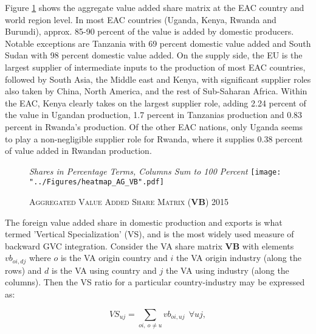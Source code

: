 \documentclass[a4paper]{article}
\begin{document}
Figure \ref{fig:wldVB} shows the aggregate value added share matrix at the EAC country and world region level. In most EAC countries (Uganda, Kenya, Rwanda and Burundi), approx. 85-90 percent of the value is added by domestic producers. Notable exceptions are Tanzania with 69 percent domestic value added and South Sudan with 98 percent domestic value added. On the supply side, the EU is the largest supplier of intermediate inputs to the production of most EAC countries, followed by South Asia, the Middle east and Kenya, with significant supplier roles also taken by China, North America, and the rest of Sub-Saharan Africa. Within the EAC, Kenya clearly takes on the largest supplier role, adding 2.24 percent of the value in Ugandan production, 1.7 percent in Tanzanias production and 0.83 percent in Rwanda's  production. Of the other EAC nations, only Uganda seems to play a non-negligible supplier role for Rwanda, where it supplies 0.38 percent of value added in Rwandan production. 

\begin{figure}[h!]
\centering
\caption{\label{fig:wldVB}\textsc{Aggregated Value Added Share Matrix (\textbf{VB}) 2015}}
\small{\textit{Shares in Percentage Terms, Columns Sum to 100 Percent}}
\texttt{[image: "../Figures/heatmap\_AG\_VB".pdf]} %
\end{figure}
\FloatBarrier


The foreign value added share in domestic production and exports is what \citet{hummels2001nature} termed 'Vertical Specialization' (VS), and is the most widely used measure of backward GVC integration. Consider the VA share matrix \textbf{VB} with elements $vb_{oi,dj}$ where $o$ is the VA origin country and $i$ the VA origin industry (along the rows) and $d$ is the VA using country and $j$ the VA using industry (along the columns). Then the VS ratio for a particular country-industry may be expressed as:

\begin{equation} \label{eq:VS}
VS_{uj} = \sum_{oi,\ o \neq  u} vb_{oi, uj}\ \ \forall uj,
\end{equation}
\end{document}
